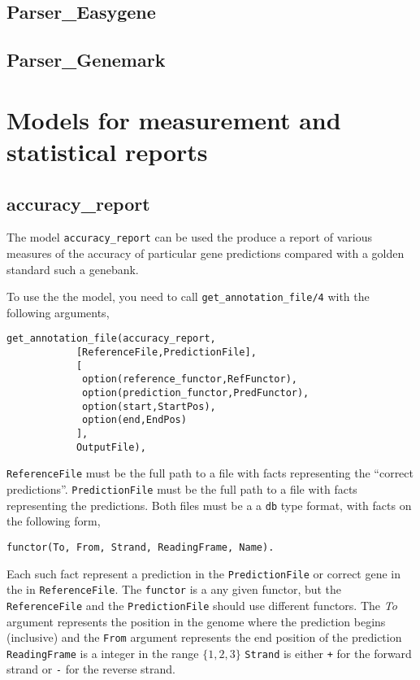 \documentclass{book}
\begin{document}
\subsection{Parser\_Easygene}

\subsection{Parser\_Genemark}

\section{Models for measurement and statistical reports}

\subsection{accuracy\_report}

The model \texttt{accuracy\_report} can be used the produce a report of
various measures of the accuracy of particular gene predictions
compared with a golden standard such a genebank. 

To use the the model, you need to call
\texttt{get\_annotation\_file/4} with the following arguments,
\begin{verbatim}
get_annotation_file(accuracy_report,
		    [ReferenceFile,PredictionFile],
		    [
		     option(reference_functor,RefFunctor),
		     option(prediction_functor,PredFunctor),
		     option(start,StartPos),
		     option(end,EndPos)
		    ],
		    OutputFile),
\end{verbatim}

\texttt{ReferenceFile} must be the full path to a file with facts
representing the ``correct predictions''.  
\texttt{PredictionFile} must be the full path to a file with facts
representing the predictions. Both files must be a a \texttt{db} type 
format, with facts on the following form,
\begin{verbatim}
functor(To, From, Strand, ReadingFrame, Name).
\end{verbatim}

Each such fact represent a prediction in the \texttt{PredictionFile} or
correct gene in the in \texttt{ReferenceFile}. 
The \texttt{functor} is a any given functor, but the
\texttt{ReferenceFile} and the \texttt{PredictionFile} should use
different functors. The \emph{To} argument represents the position in
the genome where the prediction begins (inclusive) and the
\texttt{From} argument represents the end position of the prediction
\texttt{ReadingFrame} is a integer in the range $\{1,2,3\}$
\texttt{Strand} is either \texttt{+} for the forward strand or
    \texttt{-} for the reverse strand. 
\end{document}
